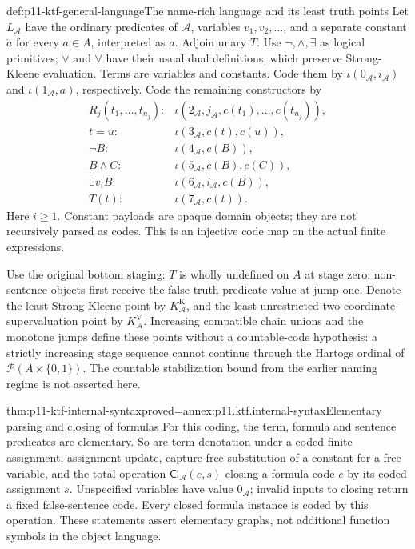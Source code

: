 \begin{hbconvention}{def:p11-ktf-general-language}{The name-rich language and its least truth points}
Let \(L_{\mathcal A}\) have the ordinary predicates of
\(\mathcal A\), variables \(v_1,v_2,\ldots\), and a separate
constant \(\dot a\) for every \(a\in A\), interpreted as \(a\).
Adjoin unary \(T\). Use \(\neg,\land,\exists\) as logical
primitives; \(\lor\) and \(\forall\) have their usual dual
definitions, which preserve Strong-Kleene evaluation.
Terms are variables and constants. Code them by
\(\iota(0_{\mathcal A},i_{\mathcal A})\) and
\(\iota(1_{\mathcal A},a)\), respectively. Code the remaining
constructors by
\[
\begin{array}{ll}
 R_j(t_1,\ldots,t_{n_j}):&
 \iota(2_{\mathcal A},j_{\mathcal A},c(t_1),\ldots,c(t_{n_j})),\\
 t=u:&\iota(3_{\mathcal A},c(t),c(u)),\\
 \neg B:&\iota(4_{\mathcal A},c(B)),\\
 B\land C:&\iota(5_{\mathcal A},c(B),c(C)),\\
 \exists v_i B:&\iota(6_{\mathcal A},i_{\mathcal A},c(B)),\\
 T(t):&\iota(7_{\mathcal A},c(t)).
\end{array}
\]
Here \(i\geq1\). Constant payloads are opaque domain objects;
they are not recursively parsed as codes. This is an injective code
map on the actual finite expressions.

Use the original bottom staging: \(T\) is wholly undefined on
\(A\) at stage zero; non-sentence objects first receive the false
truth-predicate value at jump one. Denote the least Strong-Kleene point
by \(K_{\mathcal A}^{\mathrm K}\), and the least unrestricted
two-coordinate-supervaluation point by \(K_{\mathcal A}^{\mathrm V}\).
Increasing compatible chain unions and the monotone jumps define
these points without a countable-code hypothesis: a strictly increasing
stage sequence cannot continue through the Hartogs ordinal of
\(\mathcal P(A\times\{0,1\})\). The countable stabilization bound
from the earlier naming regime is not asserted here.
\end{hbconvention}

\begin{hblemma}{thm:p11-ktf-internal-syntax}{proved=annex:p11.ktf.internal-syntax}{Elementary parsing and closing of formulas}
For this coding, the term, formula and sentence predicates are
elementary. So are term denotation under a coded finite assignment,
assignment update, capture-free substitution of a constant for a free
variable, and the total operation
\(\mathsf{Cl}_{\mathcal A}(e,s)\) closing a formula code \(e\)
by its coded assignment \(s\). Unspecified variables have value
\(0_{\mathcal A}\); invalid inputs to closing return a fixed
false-sentence code. Every closed formula instance is coded by this
operation. These statements assert elementary graphs, not additional
function symbols in the object language.
\end{hblemma}

